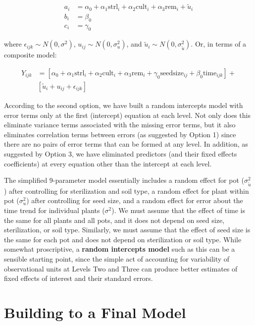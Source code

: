 \documentclass[
]{krantz}
\begin{document}
\begin{align*}
a_{i} & = \alpha_{0} + \alpha_{1}\textrm{strl}_{i} + \alpha_{2}\textrm{cult}_{i} + \alpha_{3}\textrm{rem}_{i} + \tilde{u}_{i} \\
b_{i} & = \beta_{0} \\
c_{i} & = \gamma_{0}
\end{align*}

where \(\epsilon_{ijk}\sim N(0,\sigma^2)\), \(u_{ij}\sim N(0,\sigma_{u}^{2})\), and \(\tilde{u}_{i}\sim N(0,\sigma_{\tilde{u}}^{2})\). Or, in terms of a composite model:

\begin{align*}
Y_{ijk} & = [\alpha_{0}+\alpha_{1}\textrm{strl}_{i}+\alpha_{2}\textrm{cult}_{i}+\alpha_{3}\textrm{rem}_{i} +
 \gamma_{0}\textrm{seedsize}_{ij} + \beta_{0}\textrm{time}_{ijk}] + \\
 &  [\tilde{u}_{i}+u_{ij}+\epsilon_{ijk}]
\end{align*}

According to the second option, we have built a random intercepts model with error terms only at the first (intercept) equation at each level. Not only does this eliminate variance terms associated with the missing error terms, but it also eliminates correlation terms between errors (as suggested by Option 1) since there are no pairs of error terms that can be formed at any level. In addition, as suggested by Option 3, we have eliminated predictors (and their fixed effects coefficients) at every equation other than the intercept at each level.

The simplified 9-parameter model essentially includes a random effect for pot (\(\sigma_{\tilde{u}}^{2}\)) after controlling for sterilization and soil type, a random effect for plant within pot (\(\sigma_{u}^{2}\)) after controlling for seed size, and a random effect for error about the time trend for individual plants (\(\sigma^{2}\)). We must assume that the effect of time is the same for all plants and all pots, and it does not depend on seed size, sterilization, or soil type. Similarly, we must assume that the effect of seed size is the same for each pot and does not depend on sterilization or soil type. While somewhat proscriptive, a \textbf{random intercepts model} such as this can be a sensible starting point, since the simple act of accounting for variability of observational units at Levels Two and Three can produce better estimates of fixed effects of interest and their standard errors.

\hypertarget{modelsDEF}{%
\section{Building to a Final Model}\label{modelsDEF}}
\end{document}
